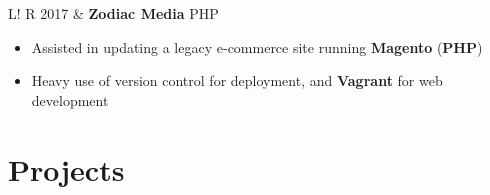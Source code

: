 \documentclass[10pt, a4paper]{article}
\newcommand\vsep{\color{lightgray} \vrule width 0.5pt}
\newcommand\sect[1]{\section*{\hspace{.05cm} \Large\sc #1}}
\newcommand\itemizespace{\vspace{-0.65\baselineskip}}
\newcommand\finishsectionspace{\vspace{-1.1\baselineskip}}
\newcommand\tspace{\hfill}
\begin{document}
\begin{tabular}{L!{\vsep}R}
                2017 & \textbf{Zodiac Media} \tspace PHP
                    \begin{itemize}[label=\raisebox{0.25ex}{\tiny$\bullet$}]
                        \setlength{\itemindent}{-0.125in}
                        \item Assisted in updating a legacy e-commerce site running \textbf{Magento} (\textbf{PHP})
                        \item Heavy use of version control for deployment, and \textbf{Vagrant} for web development
                        \finishsectionspace
                    \end{itemize}
            \end{tabular}
        \sect{Projects}
\end{document}
